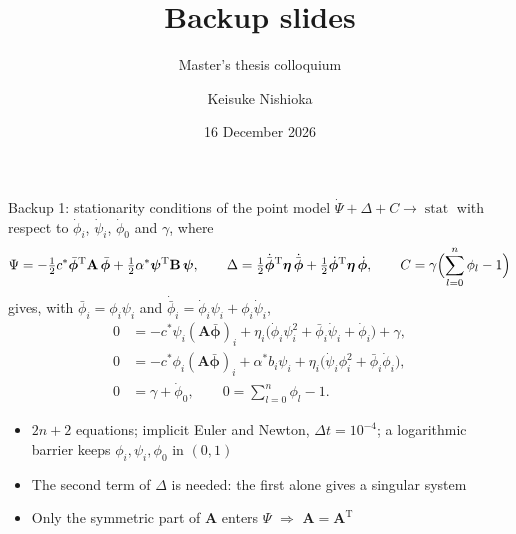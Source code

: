\documentclass[aspectratio=169,11pt]{beamer}
\title{Backup slides}
\subtitle{Master's thesis colloquium}
\author[Keisuke Nishioka]{Keisuke Nishioka}
\institute[IKM, LUH]{Institute of Continuum Mechanics (IKM), Leibniz Universit\"at Hannover}
\date{16 December 2026}
\begin{document}
\begin{frame}{Backup 1: stationarity conditions of the point model}
\small
$\dot\Psi+\Delta+C\to\operatorname{stat}$ with respect to $\dot\phi_i$, $\dot\psi_i$, $\dot\phi_0$ and $\gamma$, where
\[
\Psi=-\tfrac12c^*\bar{\bm\phi}^{\mathrm T}\mathbf A\,\bar{\bm\phi}
+\tfrac12\alpha^*\bm\psi^{\mathrm T}\mathbf B\,\bm\psi,\qquad
\Delta=\tfrac12\dot{\bar{\bm\phi}}^{\mathrm T}\bm\eta\,\dot{\bar{\bm\phi}}
+\tfrac12\dot{\bm\phi}^{\mathrm T}\bm\eta\,\dot{\bm\phi},\qquad
C=\gamma\Bigl(\sum_{l=0}^n\phi_l-1\Bigr)
\]
gives, with $\bar\phi_i=\phi_i\psi_i$ and $\dot{\bar\phi}_i=\dot\phi_i\psi_i+\phi_i\dot\psi_i$,
\[
\begin{aligned}
0&=-c^*\psi_i(\mathbf A\bar{\bm\phi})_i+\eta_i\bigl(\dot\phi_i\psi_i^2+\bar\phi_i\dot\psi_i+\dot\phi_i\bigr)+\gamma,\\
0&=-c^*\phi_i(\mathbf A\bar{\bm\phi})_i+\alpha^*b_i\psi_i+\eta_i\bigl(\dot\psi_i\phi_i^2+\bar\phi_i\dot\phi_i\bigr),\\
0&=\gamma+\dot\phi_0,\qquad 0=\textstyle\sum_{l=0}^n\phi_l-1 .
\end{aligned}
\]
\begin{itemize}
  \item $2n+2$ equations; implicit Euler and Newton, $\Delta t=10^{-4}$; a logarithmic
        barrier keeps $\phi_i,\psi_i,\phi_0$ in $(0,1)$
  \item The second term of $\Delta$ is needed: the first alone gives a singular system
  \item Only the symmetric part of $\mathbf A$ enters $\Psi$ $\Rightarrow$ $\mathbf A=\mathbf A^{\mathrm T}$
\end{itemize}
\end{frame}
\end{document}
